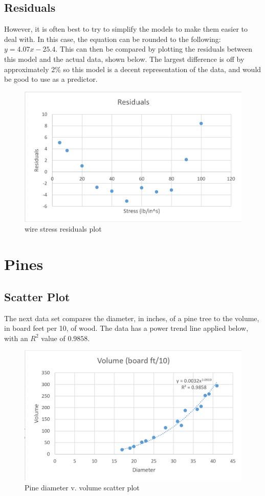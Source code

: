 \documentclass[12pt]{extarticle}
\begin{document}
\subsection{Residuals}
However, it is often best to try to simplify the models to make them easier to deal with. In this case, the equation can be rounded to the following: $y = 4.07x - 25.4$. This can then be compared by plotting the residuals between this model and the actual data, shown below. The largest difference is off by approximately 2\% so this model is a decent representation of the data, and would be good to use as a predictor.
\begin{figure}[ht!]
  \includegraphics[width=\linewidth]{ElongationResiduals.PNG}
  \caption{wire stress residuals plot}
\end{figure}
\newpage
\section{Pines}
\subsection{Scatter Plot}
The next data set compares the diameter, in inches, of a pine tree to the volume, in board feet per 10, of wood. The data has a power trend line applied below, with an $R^2$ value of $0.9858$. 
\begin{figure}[ht!]
  \includegraphics[width=\linewidth]{PineScatter.PNG}
  \caption{Pine diameter v. volume scatter plot}
\end{figure}
\newpage
\end{document}
